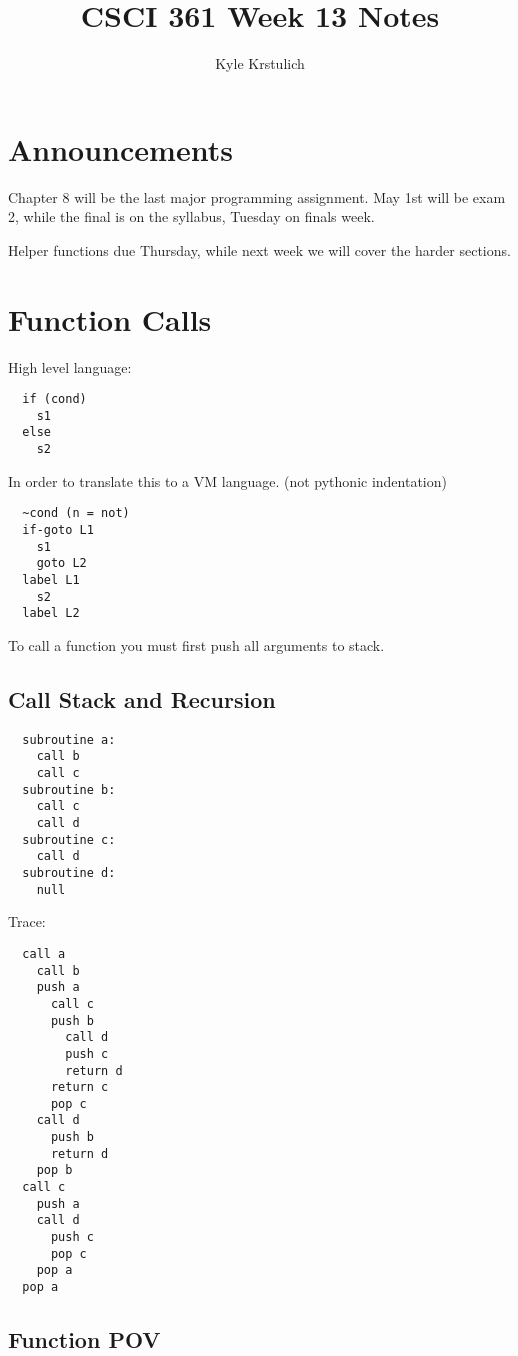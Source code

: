 \documentclass[12pt]{article}
\title{CSCI 361 Week 13 Notes}
\author{
  Kyle Krstulich
}
\begin{document}
\maketitle

\section*{Announcements}
Chapter 8 will be the last major programming assignment. May 1st will be exam 2, while the final is
on the syllabus, Tuesday on finals week.

Helper functions due Thursday, while next week we will cover the harder sections.

\section*{Function Calls}

High level language:
\begin{verbatim}
  if (cond)
    s1
  else
    s2
\end{verbatim}

In order to translate this to a VM language. (not pythonic indentation)
\begin{verbatim}
  ~cond (n = not)
  if-goto L1
    s1
    goto L2
  label L1
    s2
  label L2
\end{verbatim}

To call a function you must first push all arguments to stack.

\subsection*{Call Stack and Recursion}
\begin{verbatim}
  subroutine a:
    call b
    call c
  subroutine b:
    call c
    call d
  subroutine c:
    call d
  subroutine d:
    null
\end{verbatim}

Trace:
\begin{verbatim}
  call a
    call b
    push a
      call c
      push b
        call d
        push c
        return d
      return c
      pop c
    call d
      push b
      return d
    pop b
  call c
    push a
    call d
      push c
      pop c
    pop a
  pop a

\end{verbatim}

\subsection*{Function POV}
\end{document}
